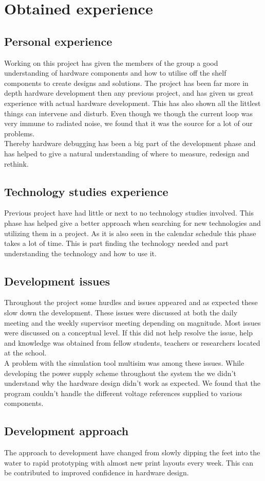\chapter{Obtained experience}

\section{Personal experience}
Working on this project has given the members of the group a good understanding of hardware components and how to utilise off the shelf components to create designs and solutions. The project has been far more in depth hardware development then any previous project, and has given us great experience with actual hardware development. This has also shown all the littlest things can intervene and disturb. Even though we though the current loop was very immune to radiated noise, we found that it was the source for a lot of our problems.\\
Thereby hardware debugging has been a big part of the development phase and has helped to give a natural understanding of where to measure, redesign and rethink.

\section{Technology studies experience}
Previous project have had little or next to no technology studies involved. This phase has helped give a better approach when searching for new technologies and utilizing them in a project. As it is also seen in the calendar schedule this phase takes a lot of time. This is part finding the technology needed and part understanding the technology and how to use it. 

\section{Development issues}
Throughout the project some hurdles and issues appeared and as expected these slow down the development. These issues were discussed at both the daily meeting and the weekly supervisor meeting depending on magnitude. Most issues were discussed on a conceptual level. If this did not help resolve the issue, help and knowledge was obtained from fellow students, teachers or researchers located at the school.\\
A problem with the simulation tool multisim was among these issues. While developing the power supply scheme throughout the system the we didn't understand why the hardware design didn't work as expected. We found that the program couldn't handle the different voltage references supplied to various components.

\section{Development approach}
The approach to development have changed from slowly dipping the feet into the water to rapid prototyping with almost new print layouts every week. This can be contributed to improved confidence in hardware design.